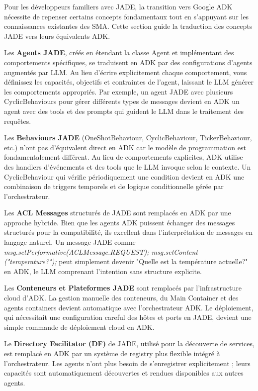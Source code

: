 Pour les développeurs familiers avec JADE, la transition vers Google ADK nécessite de repenser certains concepts fondamentaux tout en s'appuyant sur les connaissances existantes des SMA. Cette section guide la traduction des concepts JADE vers leurs équivalents ADK.

Les \textbf{Agents JADE}, créés en étendant la classe Agent et implémentant des comportements spécifiques, se traduisent en ADK par des configurations d'agents augmentés par LLM. Au lieu d'écrire explicitement chaque comportement, vous définissez les capacités, objectifs et contraintes de l'agent, laissant le LLM générer les comportements appropriés. Par exemple, un agent JADE avec plusieurs CyclicBehaviours pour gérer différents types de messages devient en ADK un agent avec des tools et des prompts qui guident le LLM dans le traitement des requêtes.

Les \textbf{Behaviours JADE} (OneShotBehaviour, CyclicBehaviour, TickerBehaviour, etc.) n'ont pas d'équivalent direct en ADK car le modèle de programmation est fondamentalement différent. Au lieu de comportements explicites, ADK utilise des handlers d'événements et des tools que le LLM invoque selon le contexte. Un CyclicBehaviour qui vérifie périodiquement une condition devient en ADK une combinaison de triggers temporels et de logique conditionnelle gérée par l'orchestrateur.

Les \textbf{ACL Messages} structurés de JADE sont remplacés en ADK par une approche hybride. Bien que les agents ADK puissent échanger des messages structurés pour la compatibilité, ils excellent dans l'interprétation de messages en langage naturel. Un message JADE comme \textit{msg.setPerformative(ACLMessage.REQUEST); msg.setContent\\("temperature?");} peut simplement devenir "Quelle est la température actuelle?" en ADK, le LLM comprenant l'intention sans structure explicite.

Les \textbf{Conteneurs et Plateformes JADE} sont remplacés par l'infrastructure cloud d'ADK. La gestion manuelle des conteneurs, du Main Container et des agents containers devient automatique avec l'orchestrateur ADK. Le déploiement, qui nécessitait une configuration careful des hôtes et ports en JADE, devient une simple commande de déploiement cloud en ADK.

Le \textbf{Directory Facilitator (DF)} de JADE, utilisé pour la découverte de services, est remplacé en ADK par un système de registry plus flexible intégré à l'orchestrateur. Les agents n'ont plus besoin de s'enregistrer explicitement ; leurs capacités sont automatiquement découvertes et rendues disponibles aux autres agents.

